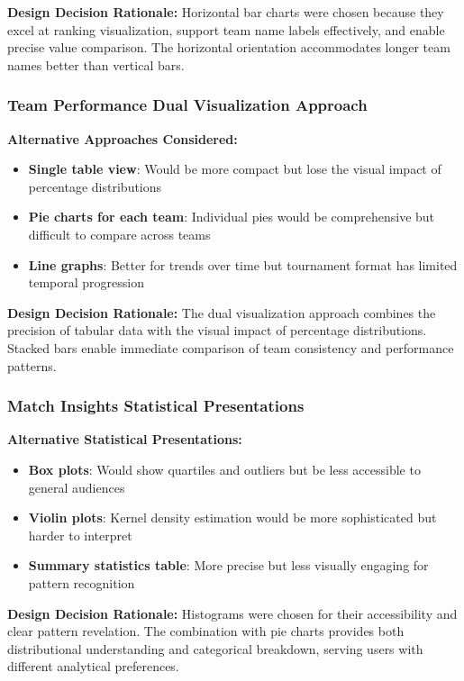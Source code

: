 \documentclass[12pt,a4paper]{article}
\begin{document}
\textbf{Design Decision Rationale:}
Horizontal bar charts were chosen because they excel at ranking visualization, support team name labels effectively, and enable precise value comparison. The horizontal orientation accommodates longer team names better than vertical bars.

\subsubsection{Team Performance Dual Visualization Approach}
\textbf{Alternative Approaches Considered:}
\begin{itemize}
    \item \textbf{Single table view}: Would be more compact but lose the visual impact of percentage distributions
    \item \textbf{Pie charts for each team}: Individual pies would be comprehensive but difficult to compare across teams
    \item \textbf{Line graphs}: Better for trends over time but tournament format has limited temporal progression
\end{itemize}

\textbf{Design Decision Rationale:}
The dual visualization approach combines the precision of tabular data with the visual impact of percentage distributions. Stacked bars enable immediate comparison of team consistency and performance patterns.

\subsubsection{Match Insights Statistical Presentations}
\textbf{Alternative Statistical Presentations:}
\begin{itemize}
    \item \textbf{Box plots}: Would show quartiles and outliers but be less accessible to general audiences
    \item \textbf{Violin plots}: Kernel density estimation would be more sophisticated but harder to interpret
    \item \textbf{Summary statistics table}: More precise but less visually engaging for pattern recognition
\end{itemize}

\textbf{Design Decision Rationale:}
Histograms were chosen for their accessibility and clear pattern revelation. The combination with pie charts provides both distributional understanding and categorical breakdown, serving users with different analytical preferences.
\end{document}

